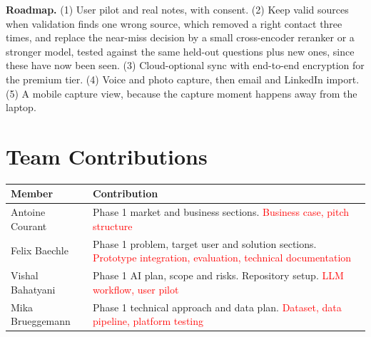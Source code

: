 \documentclass[11pt,letterpaper]{article}
\newcommand{\confirm}[1]{\textcolor{red}{#1}}
\begin{document}
\textbf{Roadmap.} (1) User pilot and real notes, with consent. (2) Keep valid sources when validation finds one wrong source, which removed a right contact three times, and replace the near-miss decision by a small cross-encoder reranker or a stronger model, tested against the same held-out questions plus new ones, since these have now been seen. (3) Cloud-optional sync with end-to-end encryption for the premium tier. (4) Voice and photo capture, then email and LinkedIn import. (5) A mobile capture view, because the capture moment happens away from the laptop.

\section{Team Contributions}
\begin{center}\small
\begin{tabularx}{\linewidth}{@{}lY@{}}
  \toprule
  Member & Contribution \\
  \midrule
  Antoine Courant & Phase 1 market and business sections. \confirm{Business case, pitch structure} \\
  Felix Baechle & Phase 1 problem, target user and solution sections. \confirm{Prototype integration, evaluation, technical documentation} \\
  Vishal Bahatyani & Phase 1 AI plan, scope and risks. Repository setup. \confirm{LLM workflow, user pilot} \\
  Mika Brueggemann & Phase 1 technical approach and data plan. \confirm{Dataset, data pipeline, platform testing} \\
  \bottomrule
\end{tabularx}
\end{center}
\end{document}
